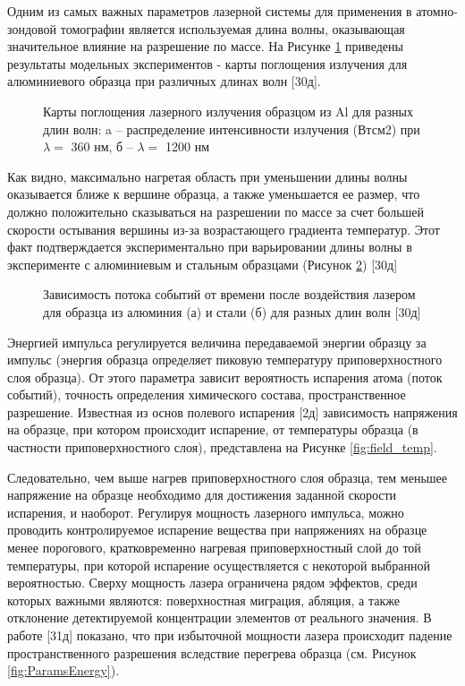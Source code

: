 Одним из самых важных параметров лазерной системы для применения в атомно-зондовой томографии является используемая длина волны, оказывающая значительное влияние на разрешение по массе. На Рисунке \cref{fig:Wavelength} приведены результаты модельных экспериментов - карты поглощения излучения для алюминиевого образца при различных длинах волн [30д].

\begin{figure}[htb]
	\caption{Карты поглощения лазерного излучения образцом из Al для разных длин волн: a – распределение интенсивности излучения (Втсм2) при $\lambda = $ 360 нм,    б – $\lambda = $ 1200 нм}
	\label{fig:Wavelength}
\end{figure}
Как видно, максимально нагретая область при уменьшении длины волны оказывается ближе к вершине образца, а также уменьшается ее размер, что должно положительно сказываться на разрешении по массе за счет большей скорости остывания вершины из-за возрастающего градиента температур. Этот факт подтверждается экспериментально при варьировании длины волны в эксперименте с алюминиевым и стальным образцами (Рисунок \cref{fig:WavelengthSteelAlum}) [30д]

\begin{figure}[htb]
	\caption{Зависимость потока событий от времени после воздействия лазером для образца из алюминия (а) и стали (б) для разных длин волн [30д]}
	\label{fig:WavelengthSteelAlum}
\end{figure}

Энергией импульса регулируется величина передаваемой энергии образцу за импульс (энергия образца определяет пиковую температуру приповерхностного слоя образца). От этого параметра зависит вероятность испарения атома (поток событий), точность определения химического состава, пространственное разрешение. Известная из основ полевого испарения [2д] зависимость напряжения на образце, при котором происходит испарение, от температуры образца (в частности приповерхностного слоя), представлена на Рисунке \cref{fig:field_temp}.

Следовательно, чем выше нагрев приповерхностного слоя образца, тем меньшее напряжение на образце необходимо для достижения заданной скорости испарения, и наоборот. Регулируя мощность лазерного импульса, можно проводить контролируемое испарение вещества при напряжениях на образце менее порогового, кратковременно нагревая приповерхностный слой до той температуры, при которой испарение осуществляется с некоторой выбранной вероятностью. Сверху мощность лазера ограничена рядом эффектов, среди которых важными являются: поверхностная миграция, абляция, а также отклонение детектируемой концентрации элементов от реального значения. В работе [31д] показано, что при избыточной мощности лазера происходит падение пространственного разрешения вследствие перегрева образца (см. Рисунок \cref{fig:ParamsEnergy}).

